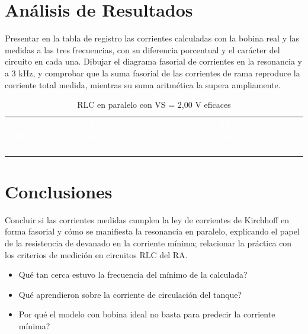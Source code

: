 \documentclass[12pt]{article}
\begin{document}
\section{Análisis de Resultados}\label{sec:analisis}
Presentar en la tabla de registro las corrientes calculadas con la bobina real y las medidas a las tres frecuencias, con su diferencia porcentual y el carácter del circuito en cada una.
\lineablanco
Dibujar el diagrama fasorial de corrientes en la resonancia y a 3 kHz, y comprobar que la suma fasorial de las corrientes de rama reproduce la corriente total medida, mientras su suma aritmética la supera ampliamente.
\begin{table}[H]
  \centering
  \caption{RLC en paralelo con VS = 2,00 V eficaces}
  \label{tab:registro-1}
  \begin{tabularx}{\linewidth}{>{\raggedright\arraybackslash}X>{\raggedright\arraybackslash}X>{\raggedright\arraybackslash}X>{\raggedright\arraybackslash}X>{\raggedright\arraybackslash}X>{\raggedright\arraybackslash}X}
    \rowcolor{iubnavy} \textcolor{white}{\textbf{Frecuencia (kHz)}} & \textcolor{white}{\textbf{IR (mA)}} & \textcolor{white}{\textbf{Ibob (mA)}} & \textcolor{white}{\textbf{IC (mA)}} & \textcolor{white}{\textbf{IT (mA)}} & \textcolor{white}{\textbf{Carácter}} \\
    \rule{0pt}{0.8cm} & & & & & \\
    \rowcolor{iubfondogris} \rule{0pt}{0.8cm} & & & & & \\
    \rule{0pt}{0.8cm} & & & & & \\
    \rowcolor{iubfondogris} \rule{0pt}{0.8cm} & & & & & \\
    \bottomrule
  \end{tabularx}
\end{table}

\section{Conclusiones}\label{sec:conclusiones}
Concluir si las corrientes medidas cumplen la ley de corrientes de Kirchhoff en forma fasorial y cómo se manifiesta la resonancia en paralelo, explicando el papel de la resistencia de devanado en la corriente mínima; relacionar la práctica con los criterios de medición en circuitos RLC del RA.
\lineablanco
\begin{itemize}
  \item \textquestiondown{}Qué tan cerca estuvo la frecuencia del mínimo de la calculada?
  \item \textquestiondown{}Qué aprendieron sobre la corriente de circulación del tanque?
  \item \textquestiondown{}Por qué el modelo con bobina ideal no basta para predecir la corriente mínima?
\end{itemize}
\end{document}
